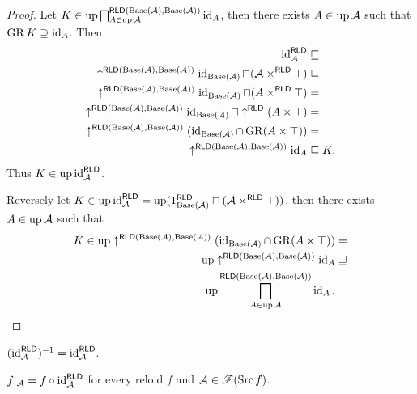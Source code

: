 \begin{proof}
Let $K\in\operatorname{up}\bigsqcap_{A\in\operatorname{up}\mathcal{A}}^{\mathsf{RLD}(\operatorname{Base}(\mathcal{A}),\operatorname{Base}(\mathcal{A}))}\operatorname{id}_{A}$,
then there exists $A\in\operatorname{up}\mathcal{A}$ such that $\operatorname{GR} K\supseteq\operatorname{id}_{A}$.
Then
\begin{align*}
\operatorname{id}_{\mathcal{A}}^{\mathsf{RLD}} & \sqsubseteq\\
\uparrow^{\mathsf{RLD}(\operatorname{Base}(\mathcal{A}),\operatorname{Base}(\mathcal{A}))}\operatorname{id}_{\operatorname{Base}(\mathcal{A})}\sqcap(\mathcal{A}\times^{\mathsf{RLD}}\top) & \sqsubseteq\\
\uparrow^{\mathsf{RLD}(\operatorname{Base}(\mathcal{A}),\operatorname{Base}(\mathcal{A}))}\operatorname{id}_{\operatorname{Base}(\mathcal{A})}\sqcap(A\times^{\mathsf{RLD}}\top) & =\\
\uparrow^{\mathsf{RLD}(\operatorname{Base}(\mathcal{A}),\operatorname{Base}(\mathcal{A}))}\operatorname{id}_{\operatorname{Base}(\mathcal{A})}\sqcap\uparrow^{\mathsf{RLD}}(A\times\top) & =\\
\uparrow^{\mathsf{RLD}(\operatorname{Base}(\mathcal{A}),\operatorname{Base}(\mathcal{A}))}(\operatorname{id}_{\operatorname{Base}(\mathcal{A})}\cap\operatorname{GR}(A\times\top)) & =\\
\uparrow^{\mathsf{RLD}(\operatorname{Base}(\mathcal{A}),\operatorname{Base}(\mathcal{A}))}\operatorname{id}_{A} & \sqsubseteq K.
\end{align*}
Thus $K\in\operatorname{up}\operatorname{id}_{\mathcal{A}}^{\mathsf{RLD}}$.

Reversely let $K\in\operatorname{up}\operatorname{id}_{\mathcal{A}}^{\mathsf{RLD}}=\operatorname{up}(1_{\operatorname{Base}(\mathcal{A})}^{\mathsf{RLD}}\sqcap(\mathcal{A}\times^{\mathsf{RLD}}\top))$,
then there exists $A\in\operatorname{up}\mathcal{A}$ such that 
\begin{align*}
K\in\operatorname{up}\uparrow^{\mathsf{RLD}(\operatorname{Base}(\mathcal{A}),\operatorname{Base}(\mathcal{A}))}(\operatorname{id}_{\operatorname{Base}(\mathcal{A})}\cap\operatorname{GR}(A\times\top)) & =\\
\operatorname{up}\uparrow^{\mathsf{RLD}(\operatorname{Base}(\mathcal{A}),\operatorname{Base}(\mathcal{A}))}\operatorname{id}_{A} & \sqsupseteq\\
\operatorname{up}\bigsqcap_{A\in\operatorname{up}\mathcal{A}}^{\mathsf{RLD}(\operatorname{Base}(\mathcal{A}),\operatorname{Base}(\mathcal{A}))}\operatorname{id}_{A}.
\end{align*}
\end{proof}
\begin{cor}
$(\operatorname{id}_{\mathcal{A}}^{\mathsf{RLD}})^{-1}=\operatorname{id}_{\mathcal{A}}^{\mathsf{RLD}}$.\end{cor}
\begin{thm}
$f|_{\mathcal{A}}=f\circ\operatorname{id}_{\mathcal{A}}^{\mathsf{RLD}}$ for every
reloid $f$ and $\mathcal{A}\in\mathscr{F}(\operatorname{Src} f)$.\end{thm}

